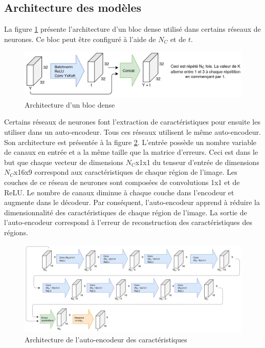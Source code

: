 \subsection{Architecture des modèles}
    La figure \ref{fig:architecture_bloc_dense} présente l'architecture d'un bloc dense utilisé dans certains réseaux de neurones. Ce bloc peut être configuré à l'aide de \(N_C\) et de \(t\).\\
    \begin{figure}
        \centering
        \includegraphics[width=15cm]{images/Architecture_DenseBlock.png}
        \caption{Architecture d'un bloc dense}
        \label{fig:architecture_bloc_dense}
    \end{figure}

    Certains réseaux de neurones font l'extraction de caractéristiques pour ensuite les utiliser dans un auto-encodeur. Tous ces réseaux utilisent le même auto-encodeur. Son architecture est présentée à la figure  \ref{fig:architecture_autoencoder_caracteristique}. L'entrée possède un nombre variable de canaux en entrée et a la même taille que la matrice d'erreurs. Ceci est dans le but que chaque vecteur de dimensions \(N_C\)x1x1 du tenseur d'entrée de dimensions \(N_C\)x16x9 correspond aux caractéristiques de chaque région de l'image. Les couches de ce réseau de neurones sont composées de convolutions 1x1 et de ReLU. Le nombre de canaux diminue à chaque couche dans l'encodeur et augmente dans le décodeur. Par conséquent, l'auto-encodeur apprend à réduire la dimensionnalité des caractéristiques de chaque région de l'image. La sortie de l'auto-encodeur correspond à l'erreur de reconstruction des caractéristiques des régions.
    \begin{figure}
        \centering
        \includegraphics[width=17cm]{images/Architecture_FeatureAutoencoder.png}
        \caption{Architecture de l'auto-encodeur des caractéristiques}
        \label{fig:architecture_autoencoder_caracteristique}
    \end{figure}

